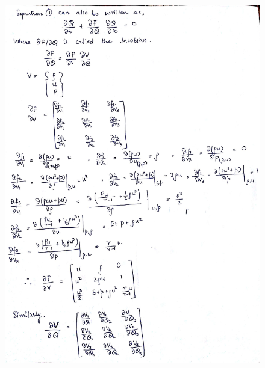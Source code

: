 \documentclass{article}
\begin{document}
\begin{figure}[H]   \label{figure}
\includegraphics[width=15cm]{two.jpg}
\label{figure:}
\end{figure}
\newpage
\end{document}
